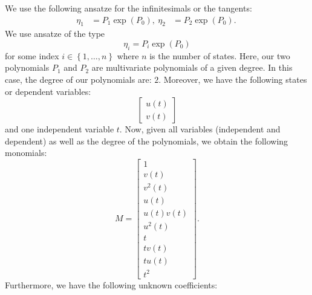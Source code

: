 \documentclass{article}
\begin{document}
We use the following ansatze for the infinitesimals or the tangents:
\begin{align*}
\eta_1&=P_1\exp\left(P_0\right),\
\eta_2&=P_2\exp\left(P_0\right).\
\end{align*}
We use ansatze of the type $$\eta_i=P_{i}\exp\left(P_{0}\right)$$ for some index $i\in\left\{1,\ldots,n\right\}$ where $n$ is the number of states.
Here, our two polynomials $P_{1}$ and $P_{2}$ are multivariate polynomials of a given degree. In this case, the degree of our polynomials are: $2$.
Moreover, we have the following states or dependent variables:
\begin{equation}
\left[\begin{matrix}u{\left(t \right)}\\v{\left(t \right)}\end{matrix}\right]
\end{equation}
and one independent variable $t$.
Now, given all variables (independent and dependent) as well as the degree of the polynomials, we obtain the following monomials:
\begin{equation}
M=\left[\begin{matrix}1\\v{\left(t \right)}\\v^{2}{\left(t \right)}\\u{\left(t \right)}\\u{\left(t \right)} v{\left(t \right)}\\u^{2}{\left(t \right)}\\t\\t v{\left(t \right)}\\t u{\left(t \right)}\\t^{2}\end{matrix}\right].
\end{equation}
Furthermore, we have the following unknown coefficients:
\end{document}
